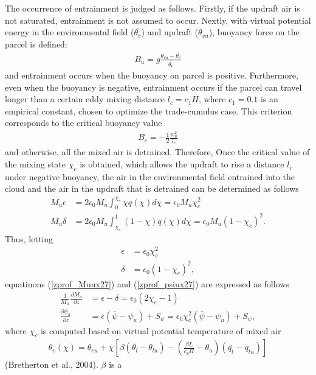 The occurrence of entrainment is judged as follows. Firstly, if the updraft air is not saturated, entrainment is not assumed to occur. Nextly, with virtual potential energy in the environmental field
(\(\overline{\theta_v}\)) and updraft (\(\theta_{vu}\)), buoyancy force on the parcel is defined: \begin{eqnarray}\label{buoy_u}
    B_u = g\frac{\theta_{vu} - \overline{\theta_{v}}}{ \overline{\theta_v}}\end{eqnarray} and entrainment occurs when the buoyancy on parcel is positive. Furthermore, even when the buoyancy is negative,
entrainment occurs if the parcel can travel longer than a certain eddy mixing distance \(l_c=c_1 H\), where \(c_1=0.1\) is an empirical constant, chosen to optimize the trade-cumulus case. This
criterion corresponds to the critical buoyancy value \begin{eqnarray}\label{buoy_c}
    B_c = -\frac{1}{2}\frac{w_u^2}{l_c}\end{eqnarray} and otherwise, all the mixed air is detrained. Therefore, Once the critical value of the mixing state \(\chi_c\) is obtained, which allows the updraft to rise
a distance \(l_c\) under negative buoyancy, the air in the environmental field entrained into the cloud and the air in the updraft that is detrained can be determined as follows \begin{eqnarray}
    M_u\epsilon&=2\epsilon_0 M_u\int_0^{\chi_c}\chi q(\chi) d\chi = \epsilon_0 M_u \chi_c^2 \label{flux_entre}\\
    M_u\delta&=2\epsilon_0 M_u\int_{\chi_c}^{1}(1-\chi) q(\chi) d\chi = \epsilon_0 M_u (1-\chi_c)^2. \label{flux_detre}\end{eqnarray} Thus, letting \begin{eqnarray}
    \epsilon&=\epsilon_0\chi_c^2 \label{Etilde}\\
    \delta&=\epsilon_0(1-\chi_c)^2, \label{Dtilde}\end{eqnarray} equatinons (\ref{zprof_Muux27}{}) and (\ref{zprof_psiux27}) are expressed as follows \begin{eqnarray}
    \frac{1}{M_u}\frac{\partial M_u}{\partial z} &= \epsilon - \delta = \epsilon_0(2\chi_c - 1) \label{zprof_Mu_param}\\
    \frac{\partial \psi_u}{\partial z} &= \epsilon (\overline{\psi}-\psi_u) + S_{\psi} = \epsilon_0\chi_c^2(\overline{\psi}-\psi_u) + S_{\psi}, \label{zprof_psi_param}\end{eqnarray} where \(\chi_c\) is computed
based on virtual potential temperature of mixed air \begin{eqnarray}\label{virt_pot_t}
    \theta_v(\chi)=\theta_{vu}+\chi\left[ \beta(\overline{\theta_l}-\theta_{lu})-\left(\frac{\beta L}{c_p\Pi}-\theta_u\right)(\overline{q_t}-q_{tu})\right]\end{eqnarray} (Bretherton et al., 2004). \(\beta\) is a
